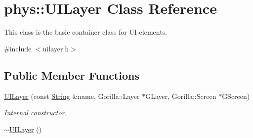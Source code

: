 \hypertarget{classphys_1_1UILayer}{
\section{phys::UILayer Class Reference}
\label{da/d48/classphys_1_1UILayer}
}


This class is the basic container class for UI elements.  




{\ttfamily \#include $<$uilayer.h$>$}

\subsection*{Public Member Functions}
\begin{DoxyCompactItemize}
\item 
\hyperlink{classphys_1_1UILayer_aee4df9be8deb377bc7905c785ddf2819}{UILayer} (const \hyperlink{namespacephys_aa03900411993de7fbfec4789bc1d392e}{String} \&name, Gorilla::Layer $\ast$GLayer, Gorilla::Screen $\ast$GScreen)
\begin{DoxyCompactList}\small\item\em Internal constructor. \item\end{DoxyCompactList}\item 
\hypertarget{classphys_1_1UILayer_ac09b13a0ebae1a2ed99f689c70ada5e5}{
\hyperlink{classphys_1_1UILayer_ac09b13a0ebae1a2ed99f689c70ada5e5}{$\sim$UILayer} ()}
\label{da/d48/classphys_1_1UILayer_ac09b13a0ebae1a2ed99f689c70ada5e5}


\end{DoxyCompactItemize}
